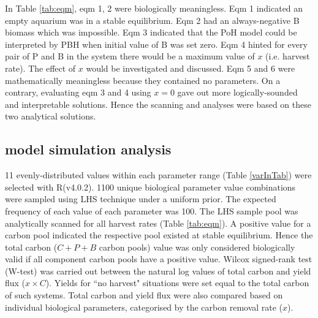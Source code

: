 \documentclass[../thesis.tex]{subfiles} %
\begin{document}
In Table \ref{tab:eqm}, eqm 1, 2 were biologically meaningless. Eqm 1 indicated an empty aquarium was in a stable equilibrium.  Eqm 2 had an always-negative B biomass which was impossible.  Eqm 3 indicated that the PoH model could be interpreted by PBH when initial value of B was set zero.  Eqm 4 hinted for every pair of P and B in the system there would be a maximum value of $x$ (i.e. harvest rate).  The effect of $x$ would be investigated and discussed.  Eqm 5 and 6 were mathematically meaningless because they contained no parameters.  On a contrary, evaluating eqm 3 and 4 using $x=0$ gave out more logically-sounded and interpretable solutions.  Hence the scanning and analyses were based on these two analytical solutions.

\subsection{model simulation analysis}
11 evenly-distributed values within each parameter range (Table \ref{varInTab}) were selected with R(v4.0.2)\autocite{r2020r}.  1100 unique biological parameter value combinations were sampled using LHS technique under a uniform prior.  The expected frequency of each value of each parameter was 100.  The LHS sample pool was analytically scanned for all harvest rates (Table \ref{tab:eqm}).  A positive value for a carbon pool indicated the respective pool existed at stable equilibrium.  Hence the total carbon ($C+P+B$ carbon pools) value was only considered biologically valid if all component carbon pools have a positive value.
Wilcox signed-rank test (W-test) was carried out between the natural log values of total carbon and yield flux ($x\times C$).  Yields for ``no harvest" situations were set equal to the total carbon of such systems.  Total carbon and yield flux were also compared based on individual biological parameters, categorised by the carbon removal rate ($x$).
\end{document}
